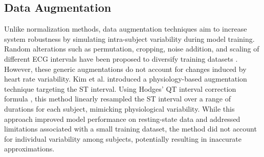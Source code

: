 \subsection{Data Augmentation}
Unlike normalization methods, data augmentation techniques aim to increase system robustness by simulating intra-subject variability during model training.
Random alterations such as permutation, cropping, noise addition, and scaling of different ECG intervals have been proposed to diversify training datasets \cite{8219706, Um_2017}.
However, these generic augmentations do not account for changes induced by heart rate variability.
Kim et al. \cite{Kim2022} introduced a physiology-based augmentation technique targeting the ST interval. Using Hodges’ QT interval correction formula \cite{hodges1983bazett}, this method linearly resampled the ST interval over a range of durations for each subject, mimicking physiological variability.
While this approach improved model performance on resting-state data and addressed limitations associated with a small training dataset, the method did not account for individual variability among subjects, potentially resulting in inaccurate approximations.